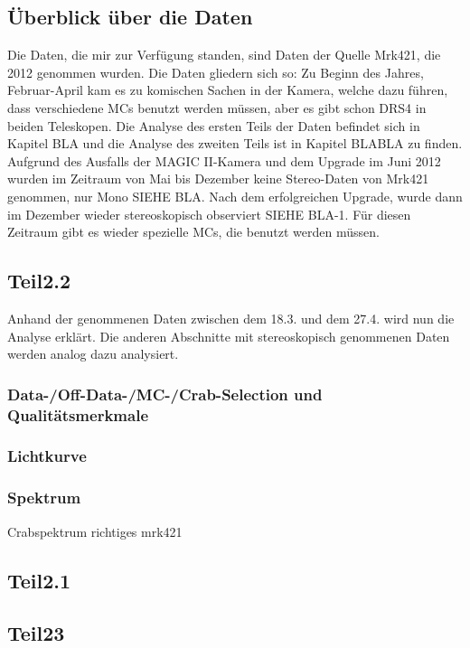 \subsection{Überblick über die Daten}
Die Daten, die mir zur Verfügung standen, sind Daten der Quelle Mrk421, die 2012 genommen wurden.
Die Daten gliedern sich so:
Zu Beginn des Jahres, Februar-April kam es zu komischen Sachen in der Kamera, welche dazu führen, dass verschiedene MCs benutzt werden müssen, aber es gibt schon DRS4 in beiden Teleskopen.
Die Analyse des ersten Teils der Daten befindet sich in Kapitel BLA und die Analyse des zweiten Teils ist in Kapitel BLABLA zu finden.
Aufgrund des Ausfalls der MAGIC II-Kamera und dem Upgrade im Juni 2012 wurden im Zeitraum von Mai bis Dezember keine Stereo-Daten von Mrk421 genommen, nur Mono SIEHE BLA.  
Nach dem erfolgreichen Upgrade, wurde dann im Dezember wieder stereoskopisch observiert SIEHE BLA-1.  
Für diesen Zeitraum gibt es wieder spezielle MCs, die benutzt werden müssen.


\subsection{Teil2.2}
Anhand der genommenen Daten zwischen dem 18.3. und dem 27.4. wird nun die Analyse erklärt.
Die anderen Abschnitte mit stereoskopisch genommenen Daten werden analog dazu analysiert. 


\subsubsection{Data-/Off-Data-/MC-/Crab-Selection und Qualitätsmerkmale}


\subsubsection{Lichtkurve}


\subsubsection{Spektrum}
Crabspektrum
richtiges mrk421


\subsection{Teil2.1}

\subsection{Teil23}

